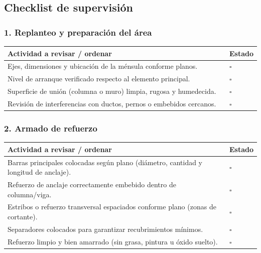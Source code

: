 \documentclass[12pt]{article}
\newcommand{\cbox}{\(\square\)} %
\begin{document}
	
	\subsection{Checklist de supervisión}
	
	\subsubsection*{1. Replanteo y preparación del área}
	\begin{tabularx}{\linewidth}{>{\raggedright\arraybackslash}p{0.93\linewidth} >{\centering\arraybackslash}m{0.07\linewidth}}
		\toprule
		\textbf{Actividad a revisar / ordenar} & \textbf{Estado}\\
		\midrule
		Ejes, dimensiones y ubicación de la ménsula conforme planos. & \cbox \\
		Nivel de arranque verificado respecto al elemento principal. & \cbox \\
		Superficie de unión (columna o muro) limpia, rugosa y humedecida. & \cbox \\
		Revisión de interferencias con ductos, pernos o embebidos cercanos. & \cbox \\
		\bottomrule
	\end{tabularx}
	
	\subsubsection*{2. Armado de refuerzo}
	\begin{tabularx}{\linewidth}{>{\raggedright\arraybackslash}p{0.93\linewidth} >{\centering\arraybackslash}m{0.07\linewidth}}
		\toprule
		\textbf{Actividad a revisar / ordenar} & \textbf{Estado}\\
		\midrule
		Barras principales colocadas según plano (diámetro, cantidad y longitud de anclaje). & \cbox \\
		Refuerzo de anclaje correctamente embebido dentro de columna/viga. & \cbox \\
		Estribos o refuerzo transversal espaciados conforme plano (zonas de cortante). & \cbox \\
		Separadores colocados para garantizar recubrimientos mínimos. & \cbox \\
		Refuerzo limpio y bien amarrado (sin grasa, pintura u óxido suelto). & \cbox \\
		\bottomrule
	\end{tabularx}
	
\end{document}
